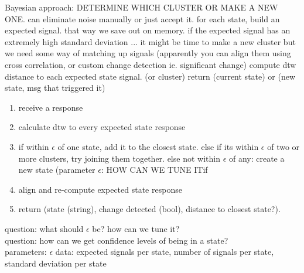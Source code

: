 \documentclass[11pt, a4paper]{article}
\begin{document}
Bayesian approach: DETERMINE WHICH CLUSTER OR MAKE A NEW ONE. can eliminate noise manually or just accept it.
for each state, build an expected signal. that way we save out on memory. 
if the expected signal has an extremely high standard deviation ... it might be time to make a new cluster
but we need some way of matching up signals (apparently you can align them using cross correlation, or custom change detection ie. significant change)
compute dtw distance to each expected state signal. (or cluster)
return (current state) or (new state, msg that triggered it)
 
%

\begin{enumerate}
    \item receive a response
    \item calculate dtw to every expected state response
    \item if within $\epsilon$ of one state, add it to the closest state. else if its within $\epsilon$ of two or more clusters, try joining them together. else not within $\epsilon$ of any: create a new state (parameter $\epsilon$: HOW CAN WE TUNE ITif 
    \item align and re-compute expected state response
    \item return (state (string), change detected (bool), distance to closest state?).
\end{enumerate}

question: what should $\epsilon$ be? how can we tune it?\\
question: how can we get confidence levels of being in a state?\\

parameters: $\epsilon$
data: expected signals per state, number of signals per state, standard deviation per state
\end{document}

